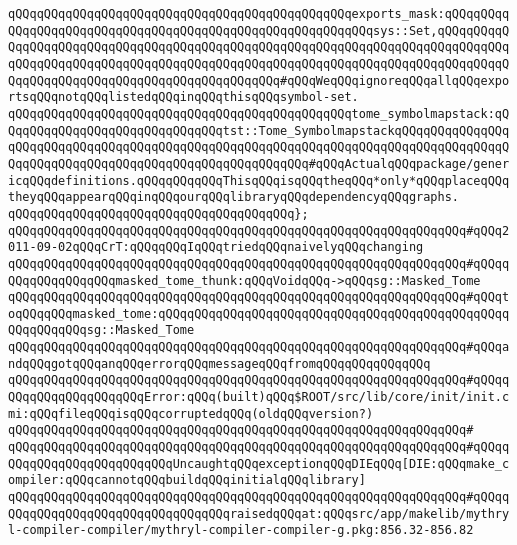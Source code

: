\verb|qQQqqQQqqQQqqQQqqQQqqQQqqQQqqQQqqQQqqQQqqQQqqQQqexports_mask:qQQqqQQqqQQqqQQqqQQqqQQqqQQqqQQqqQQqqQQqqQQqqQQqqQQqqQQqqQQqsys::Set,qQQqqQQqqQQqqQQqqQQqqQQqqQQqqQQqqQQqqQQqqQQqqQQqqQQqqQQqqQQqqQQqqQQqqQQqqQQqqQQqqQQqqQQqqQQqqQQqqQQqqQQqqQQqqQQqqQQqqQQqqQQqqQQqqQQqqQQqqQQqqQQqqQQqqQQqqQQqqQQqqQQqqQQqqQQqqQQqqQQqqQQqqQQq#qQQqWeqQQqignoreqQQqallqQQqexportsqQQqnotqQQqlistedqQQqinqQQqthisqQQqsymbol-set.|\newline
\verb|qQQqqQQqqQQqqQQqqQQqqQQqqQQqqQQqqQQqqQQqqQQqqQQqtome_symbolmapstack:qQQqqQQqqQQqqQQqqQQqqQQqqQQqqQQqtst::Tome_SymbolmapstackqQQqqQQqqQQqqQQqqQQqqQQqqQQqqQQqqQQqqQQqqQQqqQQqqQQqqQQqqQQqqQQqqQQqqQQqqQQqqQQqqQQqqQQqqQQqqQQqqQQqqQQqqQQqqQQqqQQqqQQqqQQqqQQq#qQQqActualqQQqpackage/genericqQQqdefinitions.qQQqqQQqqQQqThisqQQqisqQQqtheqQQq*only*qQQqplaceqQQqtheyqQQqappearqQQqinqQQqourqQQqlibraryqQQqdependencyqQQqgraphs.|\newline
\verb|qQQqqQQqqQQqqQQqqQQqqQQqqQQqqQQqqQQqqQQq};|\newline
\verb|qQQqqQQqqQQqqQQqqQQqqQQqqQQqqQQqqQQqqQQqqQQqqQQqqQQqqQQqqQQqqQQq#qQQq2011-09-02qQQqCrT:qQQqqQQqIqQQqtriedqQQqnaivelyqQQqchanging|\newline
\verb|qQQqqQQqqQQqqQQqqQQqqQQqqQQqqQQqqQQqqQQqqQQqqQQqqQQqqQQqqQQqqQQq#qQQqqQQqqQQqqQQqqQQqmasked_tome_thunk:qQQqVoidqQQq->qQQqsg::Masked_Tome|\newline
\verb|qQQqqQQqqQQqqQQqqQQqqQQqqQQqqQQqqQQqqQQqqQQqqQQqqQQqqQQqqQQqqQQq#qQQqtoqQQqqQQqmasked_tome:qQQqqQQqqQQqqQQqqQQqqQQqqQQqqQQqqQQqqQQqqQQqqQQqqQQqqQQqqQQqsg::Masked_Tome|\newline
\verb|qQQqqQQqqQQqqQQqqQQqqQQqqQQqqQQqqQQqqQQqqQQqqQQqqQQqqQQqqQQqqQQq#qQQqandqQQqgotqQQqanqQQqerrorqQQqmessageqQQqfromqQQqqQQqqQQqqQQq|\newline
\verb|qQQqqQQqqQQqqQQqqQQqqQQqqQQqqQQqqQQqqQQqqQQqqQQqqQQqqQQqqQQqqQQq#qQQqqQQqqQQqqQQqqQQqqQQqError:qQQq(built)qQQq$ROOT/src/lib/core/init/init.cmi:qQQqfileqQQqisqQQqcorruptedqQQq(oldqQQqversion?)|\newline
\verb|qQQqqQQqqQQqqQQqqQQqqQQqqQQqqQQqqQQqqQQqqQQqqQQqqQQqqQQqqQQqqQQq#|\newline
\verb|qQQqqQQqqQQqqQQqqQQqqQQqqQQqqQQqqQQqqQQqqQQqqQQqqQQqqQQqqQQqqQQq#qQQqqQQqqQQqqQQqqQQqqQQqqQQqUncaughtqQQqexceptionqQQqDIEqQQq[DIE:qQQqmake_compiler:qQQqcannotqQQqbuildqQQqinitialqQQqlibrary]|\newline
\verb|qQQqqQQqqQQqqQQqqQQqqQQqqQQqqQQqqQQqqQQqqQQqqQQqqQQqqQQqqQQqqQQq#qQQqqQQqqQQqqQQqqQQqqQQqqQQqqQQqqQQqraisedqQQqat:qQQqsrc/app/makelib/mythryl-compiler-compiler/mythryl-compiler-compiler-g.pkg:856.32-856.82|\newline
